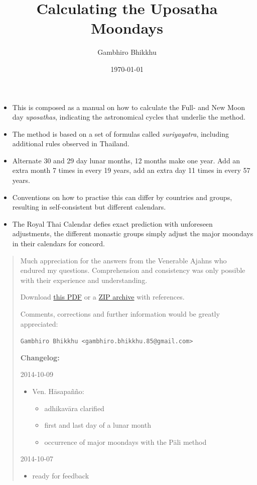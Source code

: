 \documentclass[11pt,oneside]{memoir-article}
\author{Gambhiro Bhikkhu}
\date{\today}
\title{Calculating the Uposatha Moondays}
\begin{document}
\maketitle
\begin{tldr}
\begin{itemize}
\item This is composed as a manual on how to calculate the Full- and New
Moon day \emph{uposathas}, indicating the astronomical cycles that
underlie the method.
\item The method is based on a set of formulas called \emph{suriyayatra},
including additional rules observed in Thailand.
\item Alternate 30 and 29 day lunar months, 12 months make one year. Add
an extra month 7 times in every 19 years, add an extra day 11 times
in every 57 years.
\item Conventions on how to practise this can differ by countries and
groups, resulting in self-consistent but different calendars.
\item The Royal Thai Calendar defies exact prediction with unforeseen
adjustments, the different monastic groups simply adjust the major
moondays in their calendars for concord.
\end{itemize}
\end{tldr}

\begin{quote}
Much appreciation for the answers from the Venerable Ajahns who
endured my questions. Comprehension and consistency was only possible
with their experience and understanding.

Download \href{https://github.com/profound-labs/calculating-the-uposatha-moondays/blob/master/calculating-the-uposatha-moondays.pdf}{this PDF} or a \href{https://github.com/profound-labs/calculating-the-uposatha-moondays/archive/master.zip}{ZIP archive} with references.

Comments, corrections and further information would be greatly
appreciated:

\texttt{Gambhiro Bhikkhu <gambhiro.bhikkhu.85@gmail.com>}

\textbf{Changelog:}

2014-10-09
\begin{itemize}
\item Ven. Hāsapañño:
\begin{itemize}
\item adhikavāra clarified
\item first and last day of a lunar month
\item occurrence of major moondays with the Pāli method
\end{itemize}
\end{itemize}
2014-10-07
\begin{itemize}
\item ready for feedback
\end{itemize}
\end{quote}
\end{document}
